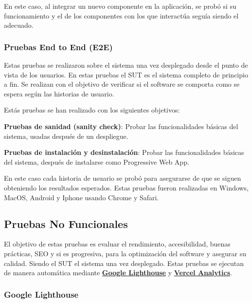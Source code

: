 \documentclass[12pt,twoside,titlepage]{report}
\begin{document}
En este caso, al integrar un nuevo componente en la aplicación, se probó si su funcionamiento y el de los componentes con los que interactúa seguía siendo el adecuado.

\subsubsection{Pruebas End to End (E2E)}

Estas pruebas se realizaron sobre el sistema una vez desplegado desde el punto de vista de los usuarios. En estas pruebas el SUT es el sistema completo de principio a fin. Se realizan con el objetivo de verificar si el software se comporta como se espera según las historias de usuario.

Estás pruebas se han realizado con los siguientes objetivos:

\begin{compactitem}
    \item \textbf{Pruebas de sanidad (sanity check)}: Probar las funcionalidades básicas del sistema, usadas después de un despliegue.
    \item \textbf{Pruebas de instalación y desinstalación}: Probar las funcionalidades básicas del sistema, después de instalarse como Progressive Web App.
\end{compactitem}

En este caso cada historia de usuario se probó para asegurarse de que se siguen obteniendo los resultados esperados. Estas pruebas fueron realizadas en Windows, MacOS, Android y Iphone usando Chrome y Safari.

\subsection{Pruebas No Funcionales}
\label{sec:nofuncionales}

El objetivo de estas pruebas es evaluar el rendimiento, accesibilidad, buenas prácticas, SEO y si es progresiva, para la optimización del software y asegurar su calidad. Siendo el SUT el sistema una vez desplegado. Estas pruebas se ejecutan de manera automática mediante \hyperref[sec:lighthouse]{\textbf{Google Lighthouse}} y \hyperref[sec:analytics]{\textbf{Vercel Analytics}}.

\subsubsection{Google Lighthouse}
\label{sec:lighthouse}
\end{document}
